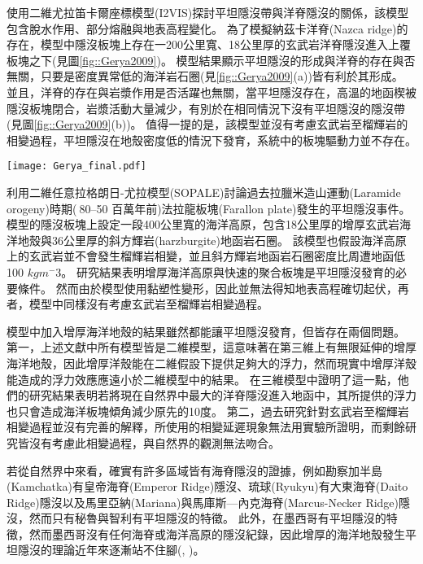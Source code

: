 \citealp{Gerya2009}使用二維尤拉笛卡爾座標模型(I2VIS)探討平坦隱沒帶與洋脊隱沒的關係，該模型包含脫水作用、部分熔融與地表高程變化。
為了模擬納茲卡洋脊(Nazca ridge)的存在，模型中隱沒板塊上存在一200公里寬、18公里厚的玄武岩洋脊隱沒進入上覆板塊之下(見圖\ref{fig::Gerya2009})。
模型結果顯示平坦隱沒的形成與洋脊的存在與否無關，只要是密度異常低的海洋岩石圈(見\ref{fig::Gerya2009}(a))皆有利於其形成。
並且，洋脊的存在與岩漿作用是否活躍也無關，當平坦隱沒存在，高溫的地函楔被隱沒板塊閉合，岩漿活動大量減少，有別於在相同情況下沒有平坦隱沒的隱沒帶(見圖\ref{fig::Gerya2009}(b))。
值得一提的是，該模型並沒有考慮玄武岩至榴輝岩的相變過程，平坦隱沒在地殼密度低的情況下發育，系統中的板塊驅動力並不存在。


\begin{figure*}[ht!]
    \centering
    \texttt{[image: Gerya\_final.pdf]}
    \caption{\citealp{Gerya2009}中模型於第12個百萬年的結果。圖組(a)與圖組(b)分別為隱沒海洋地函岩石圈密度$3100 kgm^{-3}$與$3300 kgm^{-3}$的結果。(a)上圖與(b)上圖為包含洋脊隱沒的模型，(a)(b)下圖為不包含洋脊的模型，圖中白線為等溫線。其中，顏色代表不同岩相：1、2=大陸地殼、3、4=沈積物、5、6=玄武岩、7、8=輝長岩、9、10=無水地函、11=蛇紋岩、12、13、14=含水地函。
    }
    \label{fig::Gerya2009}
\end{figure*}

\citealp{Liu2016}利用二維任意拉格朗日-尤拉模型(SOPALE)討論過去拉臘米造山運動(Laramide orogeny)時期($~$80–50 百萬年前)法拉龍板塊(Farallon plate)發生的平坦隱沒事件。
模型的隱沒板塊上設定一段400公里寬的海洋高原，包含18公里厚的增厚玄武岩海洋地殼與36公里厚的斜方輝岩(harzburgite)地函岩石圈。
該模型也假設海洋高原上的玄武岩並不會發生榴輝岩相變，並且斜方輝岩地函岩石圈密度比周遭地函低100 $kg m^-3$。
研究結果表明增厚海洋高原與快速的聚合板塊是平坦隱沒發育的必要條件。
然而由於模型使用黏塑性變形，因此並無法得知地表高程確切起伏，再者，模型中同樣沒有考慮玄武岩至榴輝岩相變過程。

模型中加入增厚海洋地殼的結果雖然都能讓平坦隱沒發育，但皆存在兩個問題。
第一，上述文獻中所有模型皆是二維模型，這意味著在第三維上有無限延伸的增厚海洋地殼，因此增厚洋殼能在二維假設下提供足夠大的浮力，然而現實中增厚洋殼能造成的浮力效應應遠小於二維模型中的結果。
\citealp{florez2019impact}在三維模型中證明了這一點，他們的研究結果表明若將現在自然界中最大的洋脊隱沒進入地函中，其所提供的浮力也只會造成海洋板塊傾角減少原先的10度。
第二，過去研究針對玄武岩至榴輝岩相變過程並沒有完善的解釋，\citealp{van2002role}所使用的相變延遲現象無法用實驗所證明，而剩餘研究皆沒有考慮此相變過程，與自然界的觀測無法吻合。

若從自然界中來看，確實有許多區域皆有海脊隱沒的證據，例如勘察加半島(Kamchatka)有皇帝海脊(Emperor Ridge)隱沒、琉球(Ryukyu)有大東海脊(Daito Ridge)隱沒以及馬里亞納(Mariana)與馬庫斯—內克海脊(Marcus-Necker Ridge)隱沒，然而只有秘魯與智利有平坦隱沒的特徵。
此外，在墨西哥有平坦隱沒的特徵，然而墨西哥沒有任何海脊或海洋高原的隱沒紀錄，因此增厚的海洋地殼發生平坦隱沒的理論近年來逐漸站不住腳(\citealp{schellart2020control}, \citealp{Schellart2021})。

